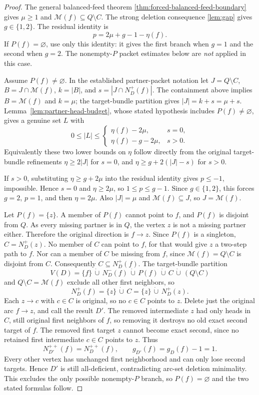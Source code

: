 \begin{proof}
The general balanced-feed theorem
\ref{thm:forced-balanced-feed-boundary} gives
$\mu\ge1$ and $\mathcal M(f)\subseteq Q\setminus C$.
The strong deletion consequence \ref{lem:gap} gives $g\in\{1,2\}$.
The residual identity is
\[
 p=2\mu+g-1-\eta(f).
\]
If $P(f)=\varnothing$, use only this identity: it gives the first
branch when $g=1$ and the second when $g=2$. The nonempty-$P$
packet estimates below are \emph{not} applied in this case.

Assume $P(f)\ne\varnothing$. In the established partner-packet notation
let $J=Q\setminus C$, $B=J\cap\mathcal M(f)$,
$k=|B|$, and $s=|J\cap N_D^+(f)|$. The containment above implies
$B=\mathcal M(f)$ and $k=\mu$; the target-bundle partition gives
$|J|=k+s=\mu+s$. Lemma~\ref{lem:partner-head-budget}, whose stated
hypothesis includes $P(f)\ne\varnothing$, gives a genuine set $L$ with
\[
 0\le|L|\le
 \begin{cases}
   \eta(f)-2\mu,&s=0,\\
   \eta(f)-g-2\mu,&s>0.
 \end{cases}
\]
Equivalently these two lower bounds on $\eta$ follow directly from
the original target-bundle refinements
$\eta\ge2|J|$ for $s=0$, and
$\eta\ge g+2(|J|-s)$ for $s>0$.

If $s>0$, substituting $\eta\ge g+2\mu$ into the residual identity
gives $p\le-1$, impossible. Hence $s=0$ and $\eta\ge2\mu$,
so $1\le p\le g-1$. Since $g\in\{1,2\}$, this forces
$g=2$, $p=1$, and then $\eta=2\mu$. Also $|J|=\mu$ and
$\mathcal M(f)\subseteq J$, so $J=\mathcal M(f)$.

Let $P(f)=\{z\}$. A member of $P(f)$ cannot point to $f$,
and $P(f)$ is disjoint from $Q$. As every missing partner is in $Q$,
the vertex $z$ is not a missing partner either. Therefore the original
direction is $f\to z$. Since $P(f)$ is a singleton,
$C=N_D^+(z)$. No member of $C$ can point to $f$, for that would
give $z$ a two-step path to $f$. Nor can a member of $C$ be missing
from $f$, since $\mathcal M(f)=Q\setminus C$ is disjoint from $C$.
Consequently $C\subseteq N_D^+(f)$. The target-bundle partition
\[
 V(D)=\{f\}\,\dot\cup\,N_D^-(f)\,\dot\cup\,P(f)
       \,\dot\cup\,C\,\dot\cup\,(Q\setminus C)
\]
and $Q\setminus C=\mathcal M(f)$ exclude all other first neighbors,
so
\[
 N_D^+(f)=\{z\}\,\dot\cup\,C
          =\{z\}\,\dot\cup\,N_D^+(z).
\]
Each $z\to c$ with $c\in C$ is original, so no $c\in C$ points
to $z$. Delete just the original arc $f\to z$, and call the result
$D'$. The removed intermediate $z$ had only heads in $C$, still
original first neighbors of $f$, so removing it destroys no old exact
second target of $f$. The removed first target $z$ cannot become
exact second, since no retained first intermediate $c\in C$ points
to $z$. Thus
\[
 N_{D'}^{++}(f)=N_D^{++}(f),\qquad
 g_{D'}(f)=g_D(f)-1=1.
\]
Every other vertex has unchanged first neighborhood and can only lose
second targets. Hence $D'$ is still all-deficient, contradicting
arc-set deletion minimality. This excludes the only possible
nonempty-$P$ branch, so $P(f)=\varnothing$ and the two stated formulas
follow.
\end{proof}

